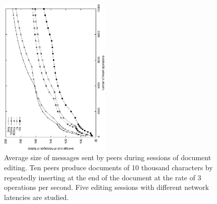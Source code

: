 \begin{figure}
  \centering
  \includegraphics[angle=-90,width=0.475\textwidth]{./img/latency.eps}
  \caption{\label{fig:latency} Average size of messages sent by peers during
    sessions of document editing. Ten peers produce documents of 10 thousand
    characters by repeatedly inserting at the end of the document at the rate
    of 3 operations per second. Five editing sessions with different network
    latencies are studied.}
\end{figure}

\ \\

